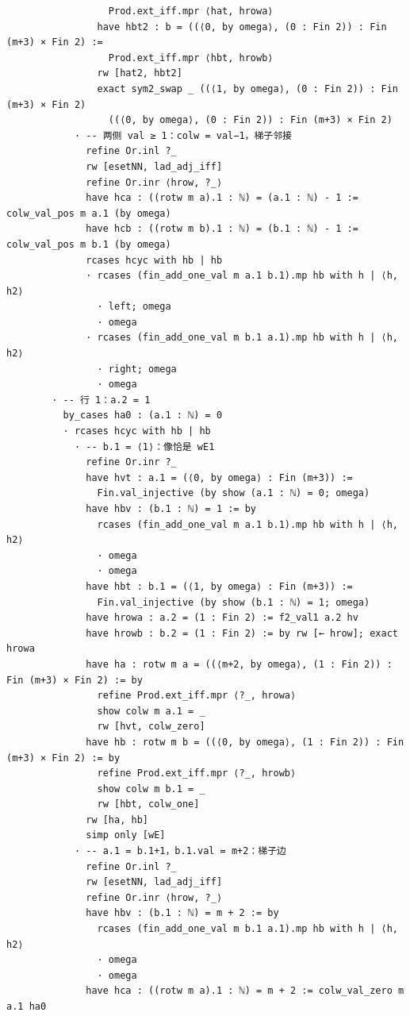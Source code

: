 \documentclass[11pt]{article}
\begin{document}
\begin{lstlisting}
                  Prod.ext_iff.mpr ⟨hat, hrowa⟩
                have hbt2 : b = ((⟨0, by omega⟩, (0 : Fin 2)) : Fin (m+3) × Fin 2) :=
                  Prod.ext_iff.mpr ⟨hbt, hrowb⟩
                rw [hat2, hbt2]
                exact sym2_swap _ ((⟨1, by omega⟩, (0 : Fin 2)) : Fin (m+3) × Fin 2)
                  ((⟨0, by omega⟩, (0 : Fin 2)) : Fin (m+3) × Fin 2)
            · -- 两侧 val ≥ 1：colw = val−1，梯子邻接
              refine Or.inl ?_
              rw [esetNN, lad_adj_iff]
              refine Or.inr ⟨hrow, ?_⟩
              have hca : ((rotw m a).1 : ℕ) = (a.1 : ℕ) - 1 := colw_val_pos m a.1 (by omega)
              have hcb : ((rotw m b).1 : ℕ) = (b.1 : ℕ) - 1 := colw_val_pos m b.1 (by omega)
              rcases hcyc with hb | hb
              · rcases (fin_add_one_val m a.1 b.1).mp hb with h | ⟨h, h2⟩
                · left; omega
                · omega
              · rcases (fin_add_one_val m b.1 a.1).mp hb with h | ⟨h, h2⟩
                · right; omega
                · omega
        · -- 行 1：a.2 = 1
          by_cases ha0 : (a.1 : ℕ) = 0
          · rcases hcyc with hb | hb
            · -- b.1 = ⟨1⟩：像恰是 wE1
              refine Or.inr ?_
              have hvt : a.1 = (⟨0, by omega⟩ : Fin (m+3)) :=
                Fin.val_injective (by show (a.1 : ℕ) = 0; omega)
              have hbv : (b.1 : ℕ) = 1 := by
                rcases (fin_add_one_val m a.1 b.1).mp hb with h | ⟨h, h2⟩
                · omega
                · omega
              have hbt : b.1 = (⟨1, by omega⟩ : Fin (m+3)) :=
                Fin.val_injective (by show (b.1 : ℕ) = 1; omega)
              have hrowa : a.2 = (1 : Fin 2) := f2_val1 a.2 hv
              have hrowb : b.2 = (1 : Fin 2) := by rw [← hrow]; exact hrowa
              have ha : rotw m a = ((⟨m+2, by omega⟩, (1 : Fin 2)) : Fin (m+3) × Fin 2) := by
                refine Prod.ext_iff.mpr ⟨?_, hrowa⟩
                show colw m a.1 = _
                rw [hvt, colw_zero]
              have hb : rotw m b = ((⟨0, by omega⟩, (1 : Fin 2)) : Fin (m+3) × Fin 2) := by
                refine Prod.ext_iff.mpr ⟨?_, hrowb⟩
                show colw m b.1 = _
                rw [hbt, colw_one]
              rw [ha, hb]
              simp only [wE]
            · -- a.1 = b.1+1，b.1.val = m+2：梯子边
              refine Or.inl ?_
              rw [esetNN, lad_adj_iff]
              refine Or.inr ⟨hrow, ?_⟩
              have hbv : (b.1 : ℕ) = m + 2 := by
                rcases (fin_add_one_val m b.1 a.1).mp hb with h | ⟨h, h2⟩
                · omega
                · omega
              have hca : ((rotw m a).1 : ℕ) = m + 2 := colw_val_zero m a.1 ha0

\end{lstlisting}
\end{document}

